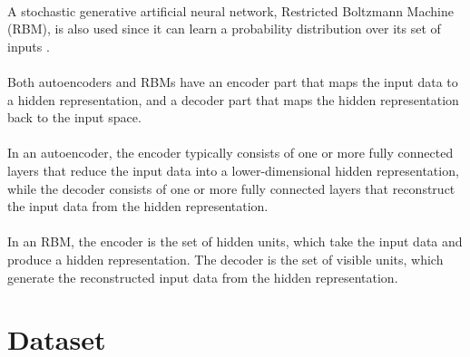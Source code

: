 \documentclass{cup-pan}
\begin{document}
\paragraph{}
A stochastic generative artificial neural network, Restricted Boltzmann Machine (RBM), is also used since it can learn a probability distribution over its set of inputs \cite{12}.
\paragraph{}

Both autoencoders and RBMs have an encoder part that maps the input data to a hidden representation, and a decoder part that maps the hidden representation back to the input space.
\\\\
In an autoencoder, the encoder typically consists of one or more fully connected layers that reduce the input data into a lower-dimensional hidden representation, while the decoder consists of one or more fully connected layers that reconstruct the input data from the hidden representation.
\\\\
In an RBM, the encoder is the set of hidden units, which take the input data and produce a hidden representation. The decoder is the set of visible units, which generate the reconstructed input data from the hidden representation.

\section{Dataset}
\label{sec:overview}
\end{document}
